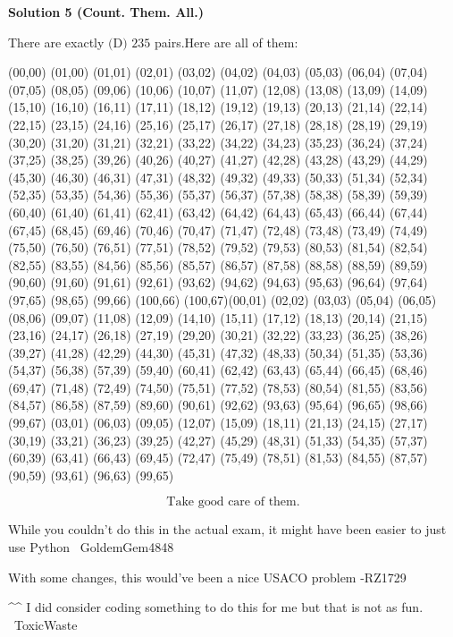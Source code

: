 \begin{enumerate}
\textbf{Solution 5 (Count. Them. All.)}

There are exactly $\boxed{\text{(D) }235}$ pairs.Here are all of them:

 (00,00) (01,00) (01,01) (02,01) (03,02) (04,02) (04,03) (05,03) (06,04) (07,04) (07,05) (08,05) (09,06) (10,06) (10,07) (11,07) (12,08) (13,08) (13,09) (14,09) (15,10) (16,10) (16,11) (17,11) (18,12) (19,12) (19,13) (20,13) (21,14) (22,14) (22,15) (23,15) (24,16) (25,16) (25,17) (26,17) (27,18) (28,18) (28,19) (29,19) (30,20) (31,20) (31,21) (32,21) (33,22) (34,22) (34,23) (35,23) (36,24) (37,24) (37,25) (38,25) (39,26) (40,26) (40,27) (41,27) (42,28) (43,28) (43,29) (44,29) (45,30) (46,30) (46,31) (47,31) (48,32) (49,32) (49,33) (50,33) (51,34) (52,34) (52,35) (53,35) (54,36) (55,36) (55,37) (56,37) (57,38) (58,38) (58,39) (59,39) (60,40) (61,40) (61,41) (62,41) (63,42) (64,42) (64,43) (65,43) (66,44) (67,44) (67,45) (68,45) (69,46) (70,46) (70,47) (71,47) (72,48) (73,48) (73,49) (74,49) (75,50) (76,50) (76,51) (77,51) (78,52) (79,52) (79,53) (80,53) (81,54) (82,54) (82,55) (83,55) (84,56) (85,56) (85,57) (86,57) (87,58) (88,58) (88,59) (89,59) (90,60) (91,60) (91,61) (92,61) (93,62) (94,62) (94,63) (95,63) (96,64) (97,64) (97,65) (98,65) (99,66) (100,66) (100,67)(00,01) (02,02) (03,03) (05,04) (06,05) (08,06) (09,07) (11,08) (12,09) (14,10) (15,11) (17,12) (18,13) (20,14) (21,15) (23,16) (24,17) (26,18) (27,19) (29,20) (30,21) (32,22) (33,23) (36,25) (38,26) (39,27) (41,28) (42,29) (44,30) (45,31) (47,32) (48,33) (50,34) (51,35) (53,36) (54,37) (56,38) (57,39) (59,40) (60,41) (62,42) (63,43) (65,44) (66,45) (68,46) (69,47) (71,48) (72,49) (74,50) (75,51) (77,52) (78,53) (80,54) (81,55) (83,56) (84,57) (86,58) (87,59) (89,60) (90,61) (92,62) (93,63) (95,64) (96,65) (98,66) (99,67) (03,01) (06,03) (09,05) (12,07) (15,09) (18,11) (21,13) (24,15) (27,17) (30,19) (33,21) (36,23) (39,25) (42,27) (45,29) (48,31) (51,33) (54,35) (57,37) (60,39) (63,41) (66,43) (69,45) (72,47) (75,49) (78,51) (81,53) (84,55) (87,57) (90,59) (93,61) (96,63) (99,65) 

 
 \[\text{Take good care of them.}\]

 While you couldn't do this in the actual exam, it might have been easier to just use Python ~GoldemGem4848

 With some changes, this would've been a nice USACO problem -RZ1729

 \textasciicircum{}\textasciicircum{} I did consider coding something to do this for me but that is not as fun. ~ToxicWaste


\end{enumerate}
